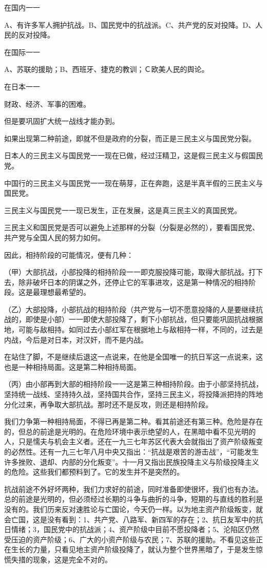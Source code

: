 在国内一一

A、有许多军人拥护抗战。B、国民党中的抗战派。C、共产党的反对投降。D、人民的反对投降。

在国际一一

A、苏联的援助；B、西班牙、捷克的教训；Ｃ欧美人民的舆论。

在日本一一

财政、经济、军事的困难。

但是要巩固扩大统一战线才能办到。

如果出现第二种前途，即就不但是政府的分裂，而正是三民主义与国民党分裂。

日本人的三民主义与国民党一一现在已做，经过汪精卫，这是假三民主义与假国民党。

中国行的三民主义与国民党一一现在萌芽，正在奔跑，这是半真半假的三民主义与国民党。

三民主义与国民党一一现已发生，正在发展，这是真三民主义的真国民党。

三民主义和国民党是否可以避免上述那样的分裂（分裂是必然的），要看国民党、共产党与全国人民的努力如何。

因此，相持阶段的可能情况，便有几种：

（甲）大部抗战，小部投降的相持阶段一一即克服投降可能，取得大部抗战。打下去，除非破坏日本的阴谋之外，还停止它的军事进攻，这是第一种情况的相持阶段。这是最理想最希望的。

（乙）大部投降，小部抗战的相持阶段（共产党与一切不愿意投降的人是要继续抗战的，即使是小部）一一即使大部投降了，剩下小部抗战，但只要能巩固抗战根据地，可能与敌相持。如同过去小部红军在根据地上与敌相持一样，不同的，过去是内战，今后是对日本，对汉奸，而不是内战。

在站住了脚，不是继续后退这一点说来，在他是全国唯一的抗日军这一点说来，这也是一种相持局面。这是第二种相持局面。

（丙）由小部再到大部的相持阶段一一这是第三种相持阶段。由于小部坚持抗战，坚持统一战线、坚持持久战，坚持国共合作，坚持三民主义，将投降派把持的阵地分化过来，再争取大部抗战。那时还不是反攻，则还是相持阶段。

我们力争第一种相持局面，不得已再是第二种。看其前途还有第三种。危险是存在的，但总的前途是光明的。在危险环境中表示绝望的人，在黑暗中看不见光明的人，只是懦夫与机会主义者。还在一九三七年苏区代表大会就指出了资产阶级叛变的必然性。还有一九三七年八月中央又指出：“抗战是艰苦的游击战”，“可能发生许多挫败、退却、内部的分化叛变”。十一月又指出民族投降主义与阶级投降主义的危险。这些我们都预料到了。它的发生并不是突然的。

抗战前途不外好坏两种，我们力求好的前途，同时准备即使很坏，我们也有办法。总的前途是光明的，但必须经过长期的斗争与曲折的斗争，短期的与直线的胜利是没有的。我们历来反对速胜论与亡国论，今天仍一样。以为地主资产阶级叛变，就会亡国，这是没有看到：1、共产党、八路军、新四军的存在；2、抗日友军中的抗日情绪；3，国民党中的抗战派；4、资产阶级中目前不愿投降者；5、沦陷区仍然受压迫的资产阶级；6、广大的小资产阶级与农民；7、苏联的援助。不看见这些正在生长的力量，只看见地主资产阶级投降了，就认为整个世界黑暗了，于是发生惊慌失措的现象，这是完全不对的。

